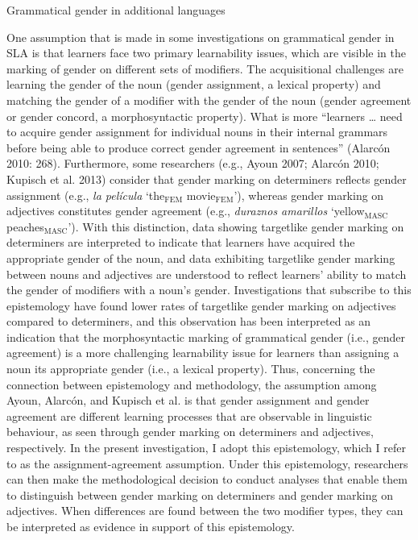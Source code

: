 \documentclass[12pt]{article}
\newcommand\textsubscript[1]{\ensuremath{{}_{\text{#1}}}}
\newenvironment{styleNoSpacing}{\setlength\leftskip{0cm}\setlength\rightskip{0cm plus 1fil}\setlength\parindent{0cm}\setlength\parfillskip{0pt plus 1fil}\setlength\parskip{0cm plus 1pt}\writerlistparindent\writerlistleftskip\leavevmode\normalfont\normalsize\fontsize{11pt}{13.2pt}\selectfont\writerlistlabel\ignorespaces}{\unskip\vspace{0cm plus 1pt}\par}
\newcommand\writerlistleftskip{}
\newcommand\writerlistparindent{}
\newcommand\writerlistlabel{}
\begin{document}
\begin{styleNoSpacing}
2.2 Grammatical gender in additional languages
\end{styleNoSpacing}

\begin{styleNoSpacing}
One assumption that is made in some investigations on grammatical gender in SLA is that learners face two primary learnability issues, which are visible in the marking of gender on different sets of modifiers. The acquisitional challenges are learning the gender of the noun (gender assignment, a lexical property) and matching the gender of a modifier with the gender of the noun (gender agreement or gender concord, a morphosyntactic property). What is more “learners … need to acquire gender assignment for individual nouns in their internal grammars before being able to produce correct gender agreement in sentences” (Alarcón 2010: 268). Furthermore, some researchers (e.g., Ayoun 2007; Alarcón 2010; Kupisch et al. 2013) consider that gender marking on determiners reflects gender assignment (e.g., \textit{la película} ‘the\textsubscript{FEM} movie\textsubscript{FEM}’), whereas gender marking on adjectives constitutes gender agreement (e.g., \textit{duraznos amarillos} ‘yellow\textsubscript{MASC} peaches\textsubscript{MASC}’). With this distinction, data showing targetlike gender marking on determiners are interpreted to indicate that learners have acquired the appropriate gender of the noun, and data exhibiting targetlike gender marking between nouns and adjectives are understood to reflect learners’ ability to match the gender of modifiers with a noun’s gender. Investigations that subscribe to this epistemology have found lower rates of targetlike gender marking on adjectives compared to determiners, and this observation has been interpreted as an indication that the morphosyntactic marking of grammatical gender (i.e., gender agreement) is a more challenging learnability issue for learners than assigning a noun its appropriate gender (i.e., a lexical property). Thus, concerning the connection between epistemology and methodology, the assumption among Ayoun, Alarcón, and Kupisch et al. is that gender assignment and gender agreement are different learning processes that are observable in linguistic behaviour, as seen through gender marking on determiners and adjectives, respectively. In the present investigation, I adopt this epistemology, which I refer to as the assignment-agreement assumption. Under this epistemology, researchers can then make the methodological decision to conduct analyses that enable them to distinguish between gender marking on determiners and gender marking on adjectives. When differences are found between the two modifier types, they can be interpreted as evidence in support of this epistemology. 
\end{styleNoSpacing}
\end{document}
